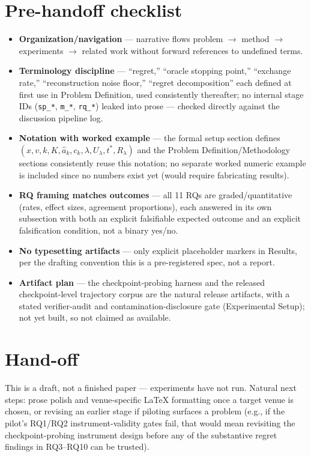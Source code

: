 \documentclass[11pt]{article}
\begin{document}
\section*{Pre-handoff checklist}
\begin{itemize}[leftmargin=1.4em]
\item \textbf{Organization/navigation} --- narrative flows problem $\to$ method $\to$ experiments $\to$ related work without forward references to undefined terms.
\item \textbf{Terminology discipline} --- ``regret,'' ``oracle stopping point,'' ``exchange rate,'' ``reconstruction noise floor,'' ``regret decomposition'' each defined at first use in Problem Definition, used consistently thereafter; no internal stage IDs (\texttt{sp\_*}, \texttt{m\_*}, \texttt{rq\_*}) leaked into prose --- checked directly against the discussion pipeline log.
\item \textbf{Notation with worked example} --- the formal setup section defines $(x, v, k, K, \hat{a}_k, c_k, \lambda, U_\lambda, t^*, R_\lambda)$ and the Problem Definition/Methodology sections consistently reuse this notation; no separate worked numeric example is included since no numbers exist yet (would require fabricating results).
\item \textbf{RQ framing matches outcomes} --- all 11 RQs are graded/quantitative (rates, effect sizes, agreement proportions), each answered in its own subsection with both an explicit falsifiable expected outcome and an explicit falsification condition, not a binary yes/no.
\item \textbf{No typesetting artifacts} --- only explicit placeholder markers in Results, per the drafting convention this is a pre-registered spec, not a report.
\item \textbf{Artifact plan} --- the checkpoint-probing harness and the released checkpoint-level trajectory corpus are the natural release artifacts, with a stated verifier-audit and contamination-disclosure gate (Experimental Setup); not yet built, so not claimed as available.
\end{itemize}

\section*{Hand-off}
This is a draft, not a finished paper --- experiments have not run. Natural next steps: prose polish and venue-specific LaTeX formatting once a target venue is chosen, or revising an earlier stage if piloting surfaces a problem (e.g., if the pilot's RQ1/RQ2 instrument-validity gates fail, that would mean revisiting the checkpoint-probing instrument design before any of the substantive regret findings in RQ3--RQ10 can be trusted).



\end{document}
